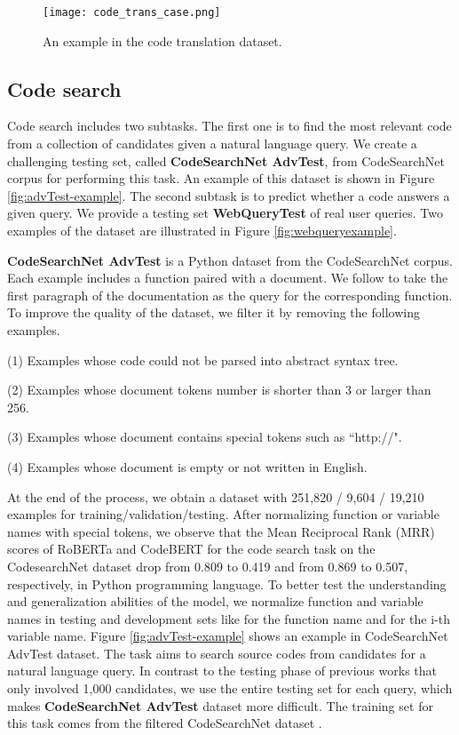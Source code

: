 \documentclass[sigconf,nonacm,screen]{acmart}
\begin{document}
\begin{figure}
    \texttt{[image: code\_trans\_case.png]}
    \caption{An example in the code translation dataset.}
    \label{fig:codetrans-example}
\end{figure}

\subsection{Code search}
\label{code_search}
Code search includes two subtasks. The first one is to find the most relevant code from a collection of candidates given a natural language query. We create a challenging testing set, called \textbf{CodeSearchNet AdvTest}, from CodeSearchNet corpus \cite{husain2019codesearchnet} for performing this task. An example of this dataset is shown in Figure \ref{fig:advTest-example}. The second subtask is to predict whether a code answers a given query.  We provide a testing set \textbf{WebQueryTest} of real user queries. Two examples of the dataset are illustrated in Figure \ref{fig:webqueryexample}.

\textbf{CodeSearchNet AdvTest} is a Python dataset from the CodeSearchNet \cite{husain2019codesearchnet} corpus. Each example includes a function paired with a document. We follow \citet{husain2019codesearchnet} to take the first paragraph of the documentation as the query for the corresponding function. To improve the quality of the dataset, we filter it by removing the following examples. 

(1) Examples whose code could not be parsed into abstract syntax tree.

(2) Examples whose document tokens number is  shorter than 3 or larger than 256.

(3) Examples whose document contains special tokens such as ``http://".

(4) Examples whose document is empty or not written in English.

At the end of the process, we obtain a dataset with 251,820 / 9,604 / 19,210 examples for training/validation/testing. 
After normalizing function or variable names with special tokens, we observe that the Mean Reciprocal Rank (MRR) scores of RoBERTa \cite{liu2019roberta} and CodeBERT \cite{feng2020codebert} for the code search task on the CodesearchNet \cite{husain2019codesearchnet} dataset drop from 0.809 to 0.419 and from 0.869 to 0.507, respectively, in Python programming language.
To better test the understanding and generalization abilities of the model, we normalize function and variable names in testing and development sets like  for the function name and  for the i-th variable name.
Figure \ref{fig:advTest-example} shows an example in CodeSearchNet AdvTest dataset.
The task aims to search source codes from candidates for a natural language query. 
In contrast to the testing phase of previous works \cite{husain2019codesearchnet,feng2020codebert} that only involved 1,000 candidates, we use the entire testing set for each query, which makes \textbf{CodeSearchNet AdvTest} dataset more difficult. The training set for this task comes from the filtered CodeSearchNet dataset \cite{husain2019codesearchnet}.
\end{document}
